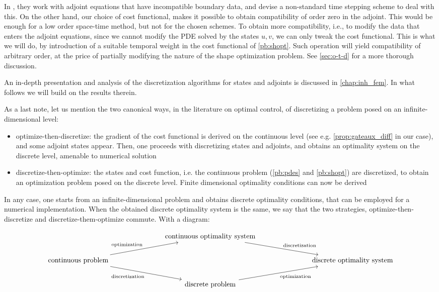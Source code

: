 \documentclass[english,a4paper,9pt,oneside]{scrbook}	%
\theoremstyle{break}
\theoremstyle{remark}
\begin{document}
In \cite{harbrecht}, they work with adjoint equations that have incompatible boundary data, and devise a non-standard time stepping scheme to deal with this. On the other hand, our choice of cost functional, makes it possible to obtain compatibility of order zero in the adjoint. This would be enough for a low order space-time method, but not for the chosen schemes. To obtain more compatibility, i.e., to modify the data that enters the adjoint equations, since we cannot modify the PDE solved by the states $u,v$, we can only tweak the cost functional. This is what we will do, by introduction of a suitable temporal weight in the cost functional of \cref{pb:shopt}. Such operation will yield compatibility of arbitrary order, at the price of partially modifying the nature of the shape optimization problem. See \cref{sec:o-t-d} for a more thorough discussion.

An in-depth presentation and analysis of the discretization algorithms for states and adjoints is discussed in \cref{chap:inh_fem}. In what follows we will build on the results therein.

As a last note, let us mention the two canonical ways, in the literature on optimal control, of discretizing a problem posed on an infinite-dimensional level:

\begin{itemize}
	\item optimize-then-discretize: the gradient of the cost functional is derived on the continuous level (see e.g. \cref{prop:gateaux_diff} in our case), and some adjoint states appear. Then, one proceeds with discretizing states and adjoints, and obtains an optimality system on the discrete level, amenable to numerical solution
	\item discretize-then-optimize: the states and cost function, i.e. the continuous problem (\cref{pb:pdes} and \cref{pb:shopt}) are discretized, to obtain an optimization problem posed on the discrete level. Finite dimensional optimality conditions can now be derived
\end{itemize}

In any case, one starts from an infinite-dimensional problem and obtains discrete optimality conditions, that can be employed for a numerical implementation. When the obtained discrete optimality system is the same, we say that the two strategies, optimize-then-discretize and discretize-them-optimize commute. With a diagram:

\[\begin{tikzcd}
	&&& \text{continuous optimality system} \\
	\text{continuous problem} &&&&&& \text{discrete optimality system}  \\
	&&& \text{discrete problem} 
	\arrow["{\text{optimization}}"', from=3-4, to=2-7]
	\arrow["{\text{discretization}}", from=1-4, to=2-7]
	\arrow["{\text{optimization}}", from=2-1, to=1-4]
	\arrow["{\text{discretization}}"', from=2-1, to=3-4]
\end{tikzcd}\]
\end{document}
